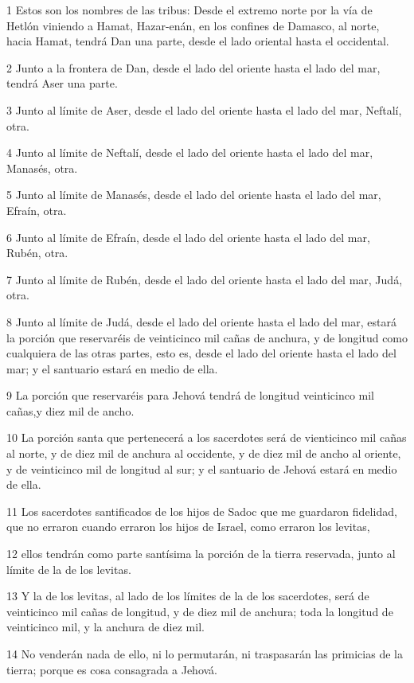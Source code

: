 \par 1 Estos son los nombres de las tribus: Desde el extremo norte por la vía de Hetlón viniendo a Hamat, Hazar-enán, en los confines de Damasco, al norte, hacia Hamat, tendrá Dan una parte, desde el lado oriental hasta el occidental.
\par 2 Junto a la frontera de Dan, desde el lado del oriente hasta el lado del mar, tendrá Aser una parte.
\par 3 Junto al límite de Aser, desde el lado del oriente hasta el lado del mar, Neftalí, otra.
\par 4 Junto al límite de Neftalí, desde el lado del oriente hasta el lado del mar, Manasés, otra.
\par 5 Junto al límite de Manasés, desde el lado del oriente hasta el lado del mar, Efraín, otra.
\par 6 Junto al límite de Efraín, desde el lado del oriente hasta el lado del mar, Rubén, otra.
\par 7 Junto al límite de Rubén, desde el lado del oriente hasta el lado del mar, Judá, otra.
\par 8 Junto al límite de Judá, desde el lado del oriente hasta el lado del mar, estará la porción que reservaréis de veinticinco mil cañas de anchura, y de longitud como cualquiera de las otras partes, esto es, desde el lado del oriente hasta el lado del mar; y el santuario estará en medio de ella.
\par 9 La porción que reservaréis para Jehová tendrá de longitud veinticinco mil cañas,y diez mil de ancho.
\par 10 La porción santa que pertenecerá a los sacerdotes será de vienticinco mil cañas al norte, y de diez mil de anchura al occidente, y de diez mil de ancho al oriente, y de veinticinco mil de longitud al sur; y el santuario de Jehová estará en medio de ella.
\par 11 Los sacerdotes santificados de los hijos de Sadoc que me guardaron fidelidad, que no erraron cuando erraron los hijos de Israel, como erraron los levitas,
\par 12 ellos tendrán como parte santísima la porción de la tierra reservada, junto al límite de la de los levitas.
\par 13 Y la de los levitas, al lado de los límites de la de los sacerdotes, será de veinticinco mil cañas de longitud, y de diez mil de anchura; toda la longitud de veinticinco mil, y la anchura de diez mil.
\par 14 No venderán nada de ello, ni lo permutarán, ni traspasarán las primicias de la tierra; porque es cosa consagrada a Jehová.
